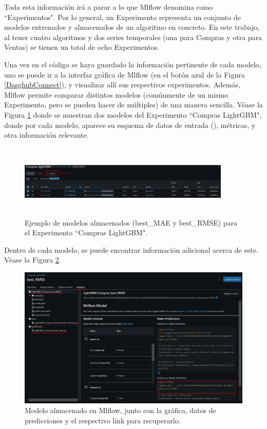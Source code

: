 Toda esta información irá a parar a lo que Mlflow denomina como ``Experimentos". Por  lo general, un Experimento representa un conjunto de modelos entrenados y almacenados de un algoritmo en concreto. En este trabajo, al tener cuatro algoritmos y dos series temporales (una para Compras y otra para Ventas) se tienen un total de ocho Experimentos. 

Una vez en el código se haya guardado la información pertinente de cada modelo, uno se puede ir a la interfaz gráfica de Mlflow (en el botón azul  de la Figura \ref{DasghubConnect}), y visualizar allí sus respectivos experimentos. Además, Mlflow permite comparar distintos modelos (comúnmente de un mismo Experimento, pero se pueden hacer de múltiples) de una manera sencilla. Véase la Figura \ref{mlflowCompare} donde se muestran dos modelos del Experimento ``Compras LightGBM", donde por cada modelo, aparece su esquema de datos de entrada (), métricas,  y otra información relevante.

\begin{figure}[H]
    \centering
    \includegraphics[width = 0.9\textwidth, height= 3.5cm]{imgs/mlflow_compare.png}
    \caption{Ejemplo de modelos almacenados (best\_MAE y  best\_RMSE) para el Experimento ``Compras LightGBM".}
    \label{mlflowCompare}
\end{figure}

Dentro de cada modelo, se puede encontrar información adicional acerca de este. Véase la Figura \ref{MlflowInfo}.

\begin{figure}[H]
    \centering
    \includegraphics[scale = 0.4]{imgs/mlflow_info.png}
    \caption{Modelo almacenado en Mlflow, junto con la gráfica, datos de predicciones y el respectivo link para recuperarlo.}
    \label{MlflowInfo}
\end{figure}

